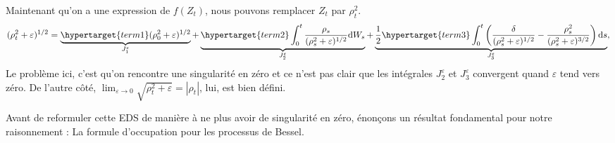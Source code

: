 \documentclass[openany]{book}
\newcommand{\1}{\mathbbm{1}}
\renewcommand{\d}{\mathrm{d}}
\theoremstyle{thmfont}
\theoremstyle{deffont}
\theoremstyle{thmfont}
\theoremstyle{deffont}
\begin{document}
Maintenant qu'on a une expression de $f(Z_t)$, nous pouvons remplacer $Z_t$ par $\rho_t^2$.
\begin{equation}
  (\rho_t^2 + \varepsilon)^{1/2} = \underbrace{\hypertarget{term1}(\rho_0^2 + \varepsilon)^{1/2}}_{J_1^\varepsilon}
  + \underbrace{\hypertarget{term2}\int_0^t  \dfrac{\rho_s}{(\rho_s^2 + \varepsilon)^{1/2}}\d W_s}_{J_2^\varepsilon}
  +  \underbrace{ \dfrac{1}{2} \hypertarget{term3} \int_0^t \left(\dfrac{\delta}{(\rho_s^2 + \varepsilon)^{1/2}} - \dfrac{\rho_s^2}{(\rho_s^2 + \varepsilon)^{3/2}}\right)\d s}_{J_3^\varepsilon},
  \label{eq:ApproxEDSBessel}
\end{equation}
Le problème ici, c'est qu'on rencontre une singularité en zéro et ce n'est pas clair que les intégrales \hyperlink{term2}{$J_2^\varepsilon$} et \hyperlink{term3}{$J_3^\varepsilon$} convergent quand $\varepsilon$ tend vers zéro. De l'autre côté, $\lim_{\varepsilon \to 0} \sqrt{\rho_t^2 + \varepsilon} = |\rho_t|$, lui, est bien défini.

Avant de reformuler cette EDS de manière à ne plus avoir de singularité en zéro, énonçons un résultat fondamental pour notre raisonnement : La formule d'occupation pour les processus de Bessel.
\end{document}

